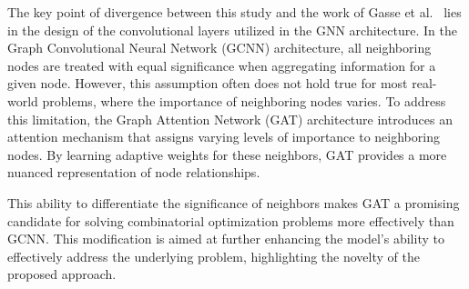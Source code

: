 The key point of divergence between this study and the work of Gasse et al.~\cite{gasseExactCombinatorialOptimization2019} lies in the design of the convolutional layers utilized in the GNN architecture.
In the Graph Convolutional Neural Network (GCNN) architecture, all neighboring nodes are treated with equal significance when aggregating information for a given node.
However, this assumption often does not hold true for most real-world problems, where the importance of neighboring nodes varies.
To address this limitation, the Graph Attention Network (GAT) architecture introduces an attention mechanism that assigns varying levels of importance to neighboring nodes.
By learning adaptive weights for these neighbors, GAT provides a more nuanced representation of node relationships.


This ability to differentiate the significance of neighbors makes GAT a promising candidate for solving combinatorial optimization problems more effectively than GCNN.
This modification is aimed at further enhancing the model's ability to effectively address the underlying problem, highlighting the novelty of the proposed approach.
